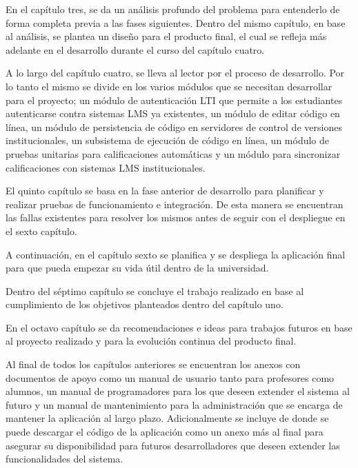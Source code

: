 En el capítulo tres, se da un análisis profundo del problema para entenderlo de forma completa previa a las fases siguientes. Dentro del mismo capítulo, en base al análisis, se plantea un diseño para el producto final, el cual se refleja más adelante en el desarrollo durante el curso del capítulo cuatro.
 
A lo largo del capítulo cuatro, se lleva al lector por el proceso de desarrollo. Por lo tanto el mismo se divide en los varios módulos que se necesitan desarrollar para el proyecto; un módulo de autenticación LTI  que permite a los estudiantes autenticarse contra sistemas LMS  ya existentes, un módulo de editar código en línea, un módulo de persistencia de código en servidores de control de versiones institucionales, un subsistema de ejecución de código en línea, un módulo de pruebas unitarias para calificaciones automáticas y un módulo para sincronizar calificaciones con sistemas LMS  institucionales.
 
El quinto capítulo se basa en la fase anterior de desarrollo para planificar y realizar pruebas de funcionamiento e integración. De esta manera se encuentran las fallas existentes para resolver los mismos antes de seguir con el despliegue en el sexto capítulo.
 
A continuación, en el capítulo sexto se planifica y se despliega la aplicación final para que pueda empezar su vida útil dentro de la universidad.
 
Dentro del séptimo capítulo se concluye el trabajo realizado en base al cumplimiento de los objetivos planteados dentro del capítulo uno.
 
En el octavo capítulo se da recomendaciones e ideas para trabajos futuros en base al proyecto realizado y para la evolución continua del producto final.

Al final de todos los capítulos anteriores se encuentran los anexos con documentos de apoyo como un manual de usuario tanto para profesores como alumnos, un manual de programadores para los que deseen extender el sistema al futuro y un manual de mantenimiento para la administración que se encarga de mantener la aplicación al largo plazo. Adicionalmente se incluye de donde se puede descargar el código de la aplicación como un anexo más al final para asegurar su disponibilidad para futuros desarrolladores que deseen extender las funcionalidades del sistema.

